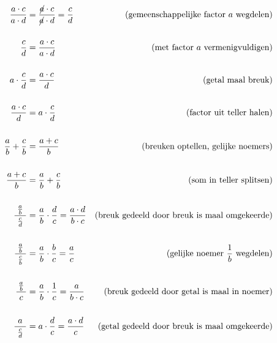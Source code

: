 \documentclass{ximera}
\begin{document}
\begin{proposition}\label{eig:rekenregels_breuken}\nl
 
{
\allowdisplaybreaks
\addtolength{\jot}{-2mm}  %
\begin{align*}
        \frac{a\cdot c}{a\cdot d} &=    \frac{\cancel{a}\cdot c}{\cancel{a}\cdot d} = \frac{c}{d}
            & \text{(gemeenschappelijke factor $a$ wegdelen)} \\
            \\
         \frac{c}{d}    &= \frac{a\cdot c}{a\cdot d}
            & \text{(met factor $a$ vermenigvuldigen)} \\
            \\
        a\cdot \frac{c}{d}   &= \frac{a\cdot c}{d}
            & \text{(getal maal breuk)}  \\
            \\
        \frac{a\cdot c}{d}   &= a\cdot \frac{c}{d}
            & \text{(factor uit teller halen)} \\
            \\
        \frac{a}{b}+\frac{c}{b}  &= \frac{a+c}{b}
            & \text{(breuken optellen, gelijke noemers)} \\
            \\
        \frac{a+c}{b} &= \frac{a}{b}+\frac{c}{b}
            & \text{(som in teller splitsen)}\\ %
            \\
        \frac{\frac{a}{b}}{\ \frac{c}{d}\ } &= \frac ab \cdot \frac dc =  \frac{a\cdot d}{b\cdot c}
            & \text{(breuk gedeeld door breuk is maal omgekeerde)}\\
            \\
        \frac{\frac{a}{b}}{\ \frac{c}{b}\ } &= \frac ab \cdot \frac bc =  \frac{a}{c}
            & \text{(gelijke noemer $\frac 1b$  wegdelen)}\\
            \\
        \frac{\frac{a}{b}}{\ c\ } &= \frac ab \cdot \frac 1c = \frac{a}{b\cdot c}
            & \text{(breuk gedeeld door getal is maal in noemer)}\\
            \\
        \frac{a}{\ \frac{c}{d}\ } &= a\cdot \frac dc = \frac{a\cdot d}{c}
            & \text{(getal gedeeld door breuk is maal omgekeerde)}\\
            \\
\end{align*}
}
\end{proposition}
\end{document}
